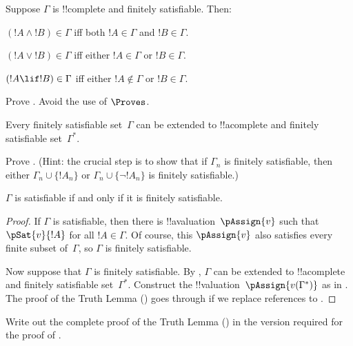 \begin{prop}
Suppose $\Gamma$ is !!{complete} and finitely satisfiable. Then:
\begin{enumerate}
$(!A \land !B) \in \Gamma$
  iff both $!A \in \Gamma$ and $!B \in \Gamma$.

$(!A \lor !B) \in \Gamma$ iff
  either $!A \in \Gamma$ or $!B \in \Gamma$.

$(!A \lif !B) \in \Gamma$ iff
  either $!A \notin \Gamma$ or $!B \in \Gamma$.
\end{enumerate}
\end{prop}




\begin{prob}
Prove . Avoid the use of $\Proves$.
\end{prob}










\begin{lem}
 Every finitely satisfiable set~$\Gamma$
can be extended to !!a{complete} and finitely satisfiable
set~$\Gamma^*$.
\end{lem}




\begin{prob}
Prove .  (Hint: the crucial
step is to show that if $\Gamma_n$ is finitely satisfiable, then
either $\Gamma_n \cup \{!A_n\}$ or $\Gamma_n \cup \{\lnot !A_n\}$ is
finitely satisfiable.)
\end{prob}


\begin{thm}[Compactness]
 $\Gamma$ is satisfiable if and only
if it is finitely satisfiable.
\end{thm}

\begin{proof}
If $\Gamma$ is satisfiable, then there is
!!a{valuation}~$\pAssign{v}$
such that $\pSat{v}{!A}$ for all $!A \in \Gamma$.
Of course, this $\pAssign{v}$ also
satisfies every finite subset of~$\Gamma$, so $\Gamma$ is finitely
satisfiable.

Now suppose that $\Gamma$ is finitely satisfiable. By ,
$\Gamma$ can be extended to !!a{complete} and
finitely satisfiable set~$\Gamma^*$. Construct the !!{valuation}~$\pAssign{v(\Gamma^*)}$
as in .
The proof of the Truth Lemma () goes through if
we replace references to .
\end{proof}




\begin{prob}
Write out the complete proof of the Truth Lemma
() in the version required for the
proof of .
\end{prob}






\OLEndChapterHook





\OLEndPartHook

